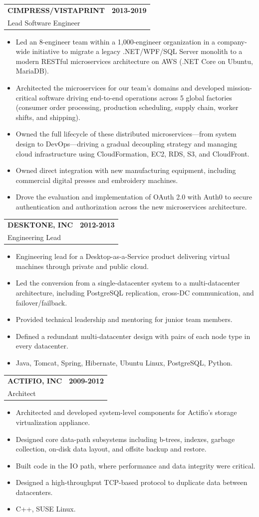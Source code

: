 \documentclass[11pt]{article}
\makeatletter
\newcommand{\jobheading}[4]{%
  \vspace{6pt}\begin{tabularx}{\textwidth}{@{}X r@{}}
    {\textbf{#1}} & {\textbf{#2}} \\
    {{\normalsize #3}\hspace{0.5em}{\color{muted}·}\hspace{0.5em}{\color{muted}#4}} & {} \\
  \end{tabularx}\vspace{2pt}
}
\makeatother
\begin{document}
\jobheading{CIMPRESS/VISTAPRINT}{2013-2019}{Lead Software Engineer}{Waltham, MA}
\begin{itemize}
\item Led an 8-engineer team within a 1,000-engineer organization in a company-wide initiative to migrate a legacy .NET/WPF/SQL Server monolith to a modern RESTful microservices architecture on AWS (.NET Core on Ubuntu, MariaDB).
\item Architected the microservices for our team's domains and developed mission-critical software driving end-to-end operations across 5 global factories (consumer order processing, production scheduling, supply chain, worker shifts, and shipping).
\item Owned the full lifecycle of these distributed microservices—from system design to DevOps—driving a gradual decoupling strategy and managing cloud infrastructure using CloudFormation, EC2, RDS, S3, and CloudFront.
\item Owned direct integration with new manufacturing equipment, including commercial digital presses and embroidery machines.
\item Drove the evaluation and implementation of OAuth 2.0 with Auth0 to secure authentication and authorization across the new microservices architecture.
\end{itemize}

\jobheading{DESKTONE, INC}{2012-2013}{Engineering Lead}{Lexington, MA}
\begin{itemize}
\item Engineering lead for a Desktop-as-a-Service product delivering virtual machines through private and public cloud.
\item Led the conversion from a single-datacenter system to a multi-datacenter architecture, including PostgreSQL replication, cross-DC communication, and failover/failback.
\item Provided technical leadership and mentoring for junior team members.
\item Defined a redundant multi-datacenter design with pairs of each node type in every datacenter.
\item Java, Tomcat, Spring, Hibernate, Ubuntu Linux, PostgreSQL, Python.
\end{itemize}

\jobheading{ACTIFIO, INC}{2009-2012}{Architect}{Waltham, MA}
\begin{itemize}
\item Architected and developed system-level components for Actifio's storage virtualization appliance.
\item Designed core data-path subsystems including b-trees, indexes, garbage collection, on-disk data layout, and offsite backup and restore.
\item Built code in the IO path, where performance and data integrity were critical.
\item Designed a high-throughput TCP-based protocol to duplicate data between datacenters.
\item C++, SUSE Linux.
\end{itemize}
\end{document}
